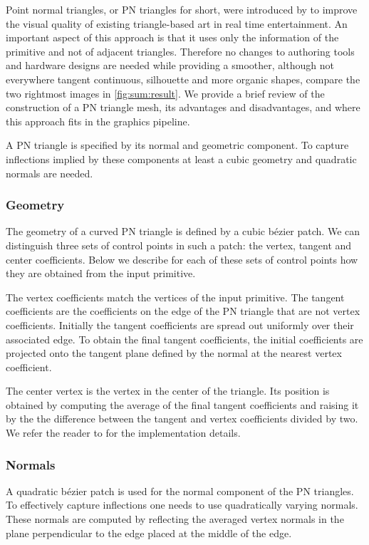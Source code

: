 \noindent Point normal triangles, or PN triangles for short, were introduced by \textcite{vlachos2001curved} to improve the visual quality of existing triangle-based art in real time entertainment. An important aspect of this approach is that it uses only the information of the primitive and not of adjacent triangles. Therefore no changes to authoring tools and hardware designs are needed while providing a smoother, although not everywhere tangent continuous, silhouette and more organic shapes, compare the two rightmost images in \cref{fig:sum:result}. We provide a brief review of the construction of a PN triangle mesh, its advantages and disadvantages, and where this approach fits in the graphics pipeline. 

A PN triangle is specified by its normal and geometric component. To capture inflections implied by these components at least a cubic geometry and quadratic normals are needed.

\subsubsection*{Geometry}
The geometry of a curved PN triangle is defined by a cubic b\'ezier patch. We can distinguish three sets of control points in such a patch: the vertex, tangent and center coefficients. Below we describe for each of these sets of control points how they are obtained from the input primitive. 

The vertex coefficients match the vertices of the input primitive. The tangent coefficients are the coefficients on the edge of the PN triangle that are not vertex coefficients. Initially the tangent coefficients are spread out uniformly over their associated edge. To obtain the final tangent coefficients, the initial coefficients are projected onto the tangent plane defined by the normal at the nearest vertex coefficient. 

The center vertex is the vertex in the center of the triangle. Its position is obtained by computing the average of the final tangent coefficients and raising it by the the difference between the tangent and vertex coefficients divided by two. We refer the reader to \textcite{vlachos2001curved} for the implementation details.

\subsubsection*{Normals}
A quadratic b\'ezier patch is used for the normal component of the PN triangles. To effectively capture inflections one needs to use quadratically varying normals. These normals are computed by reflecting the averaged vertex normals in the plane perpendicular to the edge placed at the middle of the edge.

